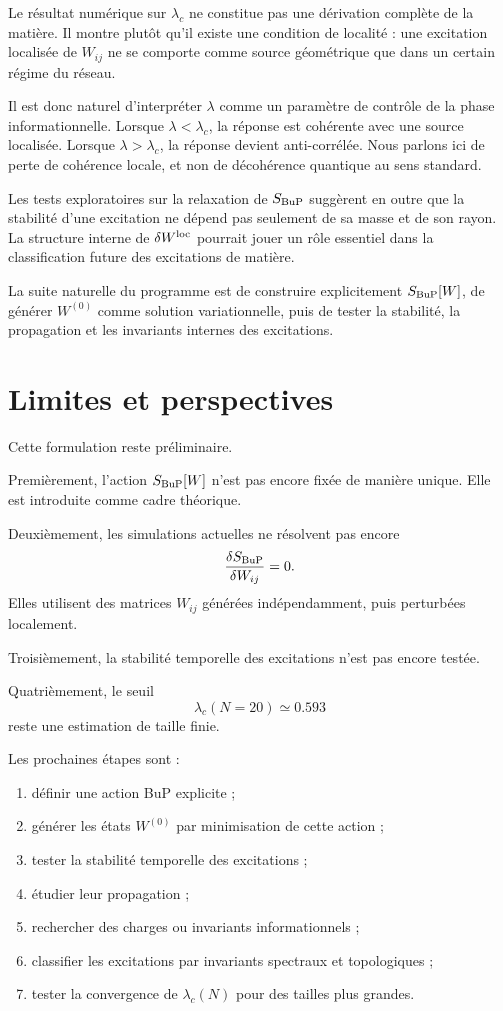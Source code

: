 \documentclass[11pt,a4paper]{article}
\begin{document}
Le résultat numérique sur \(\lambda_c\) ne constitue pas une dérivation complète de la matière. Il montre plutôt qu'il existe une condition de localité : une excitation localisée de \(W_{ij}\) ne se comporte comme source géométrique que dans un certain régime du réseau.

Il est donc naturel d'interpréter \(\lambda\) comme un paramètre de contrôle de la phase informationnelle. Lorsque \(\lambda<\lambda_c\), la réponse est cohérente avec une source localisée. Lorsque \(\lambda>\lambda_c\), la réponse devient anti-corrélée. Nous parlons ici de perte de cohérence locale, et non de décohérence quantique au sens standard.

Les tests exploratoires sur la relaxation de \(S_{\rm BuP}\) suggèrent en outre que la stabilité d'une excitation ne dépend pas seulement de sa masse et de son rayon. La structure interne de \(\delta W^{\rm loc}\) pourrait jouer un rôle essentiel dans la classification future des excitations de matière.

La suite naturelle du programme est de construire explicitement \(S_{\rm BuP}[W]\), de générer \(W^{(0)}\) comme solution variationnelle, puis de tester la stabilité, la propagation et les invariants internes des excitations.

\section{Limites et perspectives}

Cette formulation reste préliminaire.

Premièrement, l'action \(S_{\rm BuP}[W]\) n'est pas encore fixée de manière unique. Elle est introduite comme cadre théorique.

Deuxièmement, les simulations actuelles ne résolvent pas encore
\[
\frac{\delta S_{\rm BuP}}{\delta W_{ij}}=0.
\]
Elles utilisent des matrices \(W_{ij}\) générées indépendamment, puis perturbées localement.

Troisièmement, la stabilité temporelle des excitations n'est pas encore testée.

Quatrièmement, le seuil
\[
\lambda_c(N=20)\simeq0.593
\]
reste une estimation de taille finie.

Les prochaines étapes sont :
\begin{enumerate}
  \item définir une action BuP explicite ;
  \item générer les états \(W^{(0)}\) par minimisation de cette action ;
  \item tester la stabilité temporelle des excitations ;
  \item étudier leur propagation ;
  \item rechercher des charges ou invariants informationnels ;
  \item classifier les excitations par invariants spectraux et topologiques ;
  \item tester la convergence de \(\lambda_c(N)\) pour des tailles plus grandes.
\end{enumerate}
\end{document}
